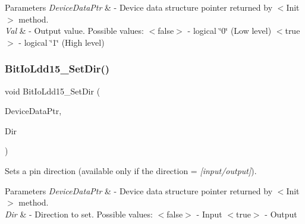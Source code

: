 \begin{DoxyParams}{Parameters}
{\em Device\+Data\+Ptr} & -\/ Device data structure pointer returned by $<$\+Init$>$ method. \\
\hline
{\em Val} & -\/ Output value. Possible values\+: $<$false$>$ -\/ logical \char`\"{}0\char`\"{} (Low level) $<$true$>$ -\/ logical \char`\"{}1\char`\"{} (High level) \\
\hline
\end{DoxyParams}
\mbox{\label{group___bit_io_ldd15__module_gaa625d107e194a1e065b8a51f20545860}} 
\subsubsection{\texorpdfstring{Bit\+Io\+Ldd15\+\_\+\+Set\+Dir()}{BitIoLdd15\_SetDir()}}
{\footnotesize\ttfamily void Bit\+Io\+Ldd15\+\_\+\+Set\+Dir (\begin{DoxyParamCaption}\item[{\hyperlink{group___p_e___types__module_gac5cf1362f1f0e3a2ce71b1bf2276d091}{L\+D\+D\+\_\+\+T\+Device\+Data} $\ast$}]{Device\+Data\+Ptr,  }\item[{\hyperlink{group___p_e___types__module_ga97a80ca1602ebf2303258971a2c938e2}{bool}}]{Dir }\end{DoxyParamCaption})}



Sets a pin direction (available only if the direction = {\itshape \mbox{[}input/output\mbox{]}}). 


\begin{DoxyParams}{Parameters}
{\em Device\+Data\+Ptr} & -\/ Device data structure pointer returned by $<$\+Init$>$ method. \\
\hline
{\em Dir} & -\/ Direction to set. Possible values\+: $<$false$>$ -\/ Input $<$true$>$ -\/ Output \\
\hline
\end{DoxyParams}
\mbox{\label{group___bit_io_ldd15__module_gada439e248c981dbaf15efd269de4d4d2}} 
